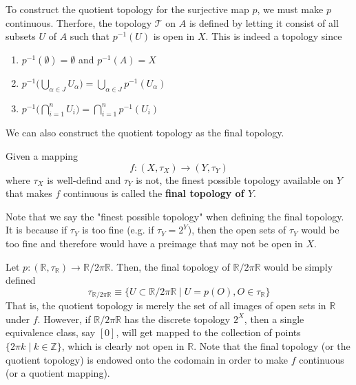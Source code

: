 \documentclass{article}
\begin{document}
    To construct the quotient topology for the surjective map $p$, we must make $p$ continuous. Therfore, the topology $\mathscr{T}$ on $A$ is defined by letting it consist of all subsets $U$ of $A$ such that $p^{-1}(U)$ is open in $X$. This is indeed a topology since
    \begin{enumerate}
        \item $p^{-1} (\emptyset) = \emptyset$ and $p^{-1}(A) = X$
        \item $p^{-1} \Big( \bigcup_{\alpha \in J} U_\alpha \Big) = \bigcup_{\alpha \in J} p^{-1} (U_\alpha)$
        \item $p^{-1} \Big( \bigcap_{i=1}^n U_i \Big) = \bigcap_{i=1}^n p^{-1} (U_i)$
    \end{enumerate}

    We can also construct the quotient topology as the final topology. 

    \begin{definition}
    Given a mapping 
    \[f: (X, \tau_X) \longrightarrow (Y, \tau_Y)\]
    where $\tau_X$ is well-defind and $\tau_Y$ is not, the finest possible topology available on $Y$ that makes $f$ continuous is called the \textbf{final topology of $Y$}. 
    \end{definition}

    Note that we say the "finest possible topology" when defining the final topology. It is because if $\tau_Y$ is too fine (e.g. if $\tau_Y = 2^Y$), then the open sets of $\tau_Y$ would be too fine and therefore would have a preimage that may not be open in $X$. 

    \begin{example}
    Let $p: (\mathbb{R}, \tau_\mathbb{R}) \longrightarrow \mathbb{R} / 2 \pi \mathbb{R}$. Then, the final topology of $\mathbb{R} / 2 \pi \mathbb{R}$ would be simply defined 
    \[\tau_{\mathbb{R} / 2 \pi \mathbb{R}} \equiv \{U \subset \mathbb{R} / 2\pi \mathbb{R} \; | \; U = p(O), O \in \tau_\mathbb{R}\}\]
    That is, the quotient topology is merely the set of all images of open sets in $\mathbb{R}$ under $f$. However, if $\mathbb{R} / 2 \pi \mathbb{R}$ has the discrete topology $2^X$, then a single equivalence class, say $[0]$, will get mapped to the collection of points $\{2 \pi k \; | \; k \in \mathbb{Z}\}$, which is clearly not open in $\mathbb{R}$. Note that the final topology (or the quotient topology) is endowed onto the codomain in order to make $f$ continuous (or a quotient mapping). 
    \end{example}
\end{document}
